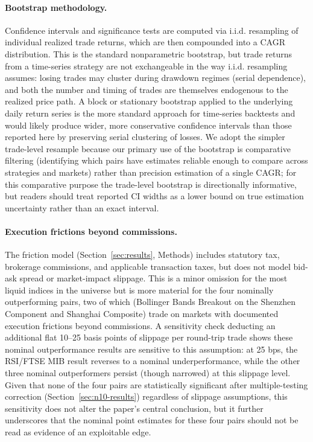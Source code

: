 \documentclass[11pt]{article}
\begin{document}
\paragraph{Bootstrap methodology.} Confidence intervals and significance tests are computed via i.i.d. resampling of individual realized trade returns, which are then compounded into a CAGR distribution. This is the standard nonparametric bootstrap, but trade returns from a time-series strategy are not exchangeable in the way i.i.d. resampling assumes: losing trades may cluster during drawdown regimes (serial dependence), and both the number and timing of trades are themselves endogenous to the realized price path. A block or stationary bootstrap applied to the underlying daily return series \citep{politis1994, ledoit2008} is the more standard approach for time-series backtests and would likely produce wider, more conservative confidence intervals than those reported here by preserving serial clustering of losses. We adopt the simpler trade-level resample because our primary use of the bootstrap is comparative filtering (identifying which pairs have estimates reliable enough to compare across strategies and markets) rather than precision estimation of a single CAGR; for this comparative purpose the trade-level bootstrap is directionally informative, but readers should treat reported CI widths as a lower bound on true estimation uncertainty rather than an exact interval.

\paragraph{Execution frictions beyond commissions.} The friction model (Section~\ref{sec:results}, Methods) includes statutory tax, brokerage commissions, and applicable transaction taxes, but does not model bid-ask spread or market-impact slippage. This is a minor omission for the most liquid indices in the universe but is more material for the four nominally outperforming pairs, two of which (Bollinger Bands Breakout on the Shenzhen Component and Shanghai Composite) trade on markets with documented execution frictions beyond commissions. A sensitivity check deducting an additional flat 10--25 basis points of slippage per round-trip trade shows these nominal outperformance results are sensitive to this assumption: at 25 bps, the RSI/FTSE MIB result reverses to a nominal underperformance, while the other three nominal outperformers persist (though narrowed) at this slippage level. Given that none of the four pairs are statistically significant after multiple-testing correction (Section~\ref{sec:n10-results}) regardless of slippage assumptions, this sensitivity does not alter the paper's central conclusion, but it further underscores that the nominal point estimates for these four pairs should not be read as evidence of an exploitable edge.
\end{document}
